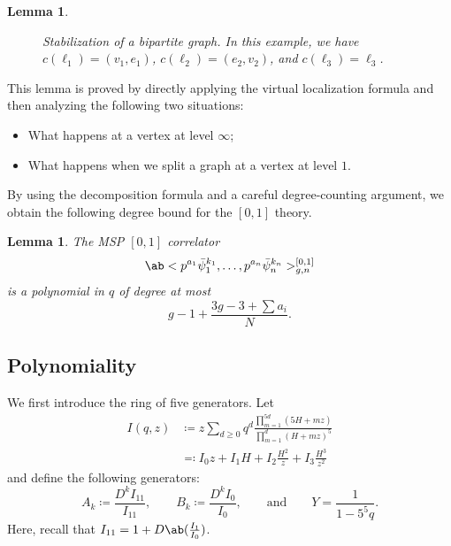 \documentclass[10pt,oldfontcommands,oneside]{memoir}
\newtheorem{lem}[thm]{Lemma}
\theoremstyle{definition}
\theoremstyle{remark}
\theoremstyle{plain}
\theoremstyle{definition}
\theoremstyle{remark}
\newcommand{\1}{\mathbf{1}}
\newcommand{\2}{\mathbf{2}}
\newcommand{\3}{\mathbf{3}}
\begin{document}
\begin{lem}
\begin{figure}[htpb]
\begin{center}
    \end{center}
    \caption{Stabilization of a bipartite graph. In this example, we have $c(\ell_1) = (v_1, e_1)$, $c(\ell_2) = (e_2, v_2)$, and $c(\ell_3) = \ell_3$.}%
    \label{fig:stab}
    \end{figure}
\end{lem}

This lemma is proved by directly applying the virtual localization formula and then analyzing the following two situations:
\begin{itemize}
    \item What happens at a vertex at level $\infty$;
    \item What happens when we split a graph at a vertex at level $1$.
\end{itemize}

By using the decomposition formula and a careful degree-counting argument, we obtain the following degree bound for the $[0,1]$ theory.
\begin{lem}
    The MSP $[0,1]$ correlator
    \[ \ab<p^{a_1} \bar{\psi}_1^{k_1}, \dots, p^{a_n} \bar{\psi}_n^{k_n}>_{g,n}^{[0,1]} \]
    is a polynomial in $q$ of degree at most 
    \[ g-1 + \frac{3g-3 + \sum a_i}{N}. \]
\end{lem}

\subsection{Polynomiality}%
\label{sub:Polynomiality}

We first introduce the ring of five generators. Let
\begin{align*}
    I(q,z) &\coloneqq z \sum_{d \geq 0} q^d \frac{\prod_{m=1}^{5d}(5H+mz)}{\prod_{m=1}^d (H+mz)^5} \\
    &\eqqcolon I_0 z + I_1 H + I_2 \frac{H^2}{z} + I_3 \frac{H^3}{z^2}
\end{align*}
and define the following generators:
\[ A_k \coloneqq \frac{D^k I_{11}}{I_{11}}, \qquad B_k \coloneqq \frac{D^k I_0}{I_0}, \qquad \text{and} \qquad Y = \frac{1}{1-5^5q}. \]
Here, recall that $I_{11} = 1 + D\ab(\frac{I_1}{I_0})$.
\end{document}
